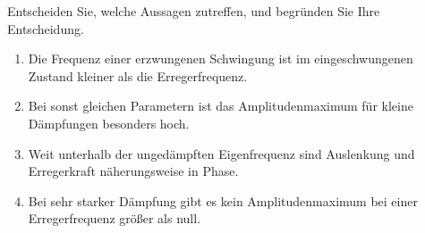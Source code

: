 \begin{ExerciseBlock}
Entscheiden Sie, welche Aussagen zutreffen, und begründen Sie Ihre Entscheidung.
\begin{enumerate}
\item Die Frequenz einer erzwungenen Schwingung ist im eingeschwungenen Zustand kleiner als die Erregerfrequenz.
\item Bei sonst gleichen Parametern ist das Amplitudenmaximum für kleine Dämpfungen besonders hoch.
\item Weit unterhalb der ungedämpften Eigenfrequenz sind Auslenkung und Erregerkraft näherungsweise in Phase.
\item Bei sehr starker Dämpfung gibt es kein Amplitudenmaximum bei einer Erregerfrequenz größer als null.
\end{enumerate}
\end{ExerciseBlock}
